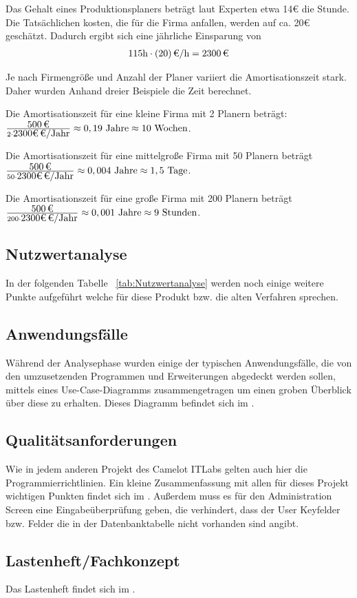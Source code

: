Das Gehalt eines Produktionsplaners beträgt laut Experten etwa 14€ die Stunde. Die Tatsächlichen kosten, die für die Firma anfallen, werden auf ca. 20€ geschätzt.
Dadurch ergibt sich eine jährliche Einsparung von 
\begin{eqnarray}
115 \mbox{h} \cdot \eur{(20)}{\mbox{/h}} = \eur{2300}
\end{eqnarray}

Je nach Firmengröße und Anzahl der Planer variiert die Amortisationszeit stark. Daher wurden Anhand dreier Beispiele die Zeit berechnet.

Die Amortisationszeit für eine kleine Firma mit 2 Planern beträgt:
$\frac{\eur{500}}{2 \cdot \eur{2300€} \mbox{/Jahr} } \approx 0,19 \mbox{ Jahre} \approx 10 \mbox{ Wochen}$.

Die Amortisationszeit für eine mittelgroße Firma mit 50 Planern beträgt
$\frac{\eur{500}}{50 \cdot \eur{2300€} \mbox{/Jahr} } \approx 0,004 \mbox{ Jahre} \approx 1,5 \mbox{ Tage}$.

Die Amortisationszeit für eine große Firma mit 200 Planern beträgt
$\frac{\eur{500}}{200 \cdot \eur{2300€} \mbox{/Jahr} } \approx 0,001 \mbox{ Jahre} \approx 9 \mbox{ Stunden}$.

\subsection{Nutzwertanalyse}
\label{sec:Nutzwertanalyse}
In der folgenden Tabelle ~\ref{tab:Nutzwertanalyse} werden noch einige weitere Punkte aufgeführt welche für diese Produkt bzw. die alten Verfahren sprechen.


\subsection{Anwendungsfälle}
\label{sec:Anwendungsfaelle}
Während der Analysephase wurden einige der typischen Anwendungsfälle, die von den umzusetzenden Programmen und Erweiterungen abgedeckt werden sollen, mittels eines Use-Case-Diagramms zusammengetragen um einen groben Überblick über diese zu erhalten. Dieses Diagramm befindet sich im .

\subsection{Qualitätsanforderungen}
\label{sec:Qualitaetsanforderungen}
Wie in jedem anderen Projekt des Camelot ITLabs gelten auch hier die Programmierrichtlinien. Ein kleine Zusammenfassung mit allen für dieses Projekt wichtigen Punkten findet sich im . Außerdem muss es für den Administration Screen eine Eingabeüberprüfung geben, die verhindert, dass der User Keyfelder bzw. Felder die in der Datenbanktabelle nicht vorhanden sind angibt.

\subsection{Lastenheft/Fachkonzept}
\label{sec:Lastenheft}
Das Lastenheft findet sich im . 

